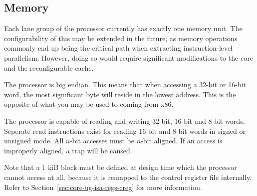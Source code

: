 
\subsection{Memory}
\label{sec:core-ug-isa-memory}

Each lane group of the \rvex{} processor currently has exactly one memory unit.
The configurability of this may be extended in the future, as memory operations
commonly end up being the critical path when extracting instruction-level
parallelism. However, doing so would require significant modifications to the
\rvex{} core and the reconfigurable cache.

The \rvex{} processor is big endian. This means that when accessing a 32-bit or 
16-bit word, the most significant byte will reside in the lowest address. This
is the opposite of what you may be used to coming from x86.

The \rvex{} processor is capable of reading and writing 32-bit, 16-bit and 8-bit
words. Seperate read instructions exist for reading 16-bit and 8-bit words in
signed or unsigned mode. All $n$-bit accesses must be $n$-bit aligned. If an
access is improperly aligned, a  trap will be caused.

Note that a 1 kiB block must be defined at design time which the \rvex{}
processor cannot access at all, because it is remapped to the control register
file internally. Refer to Section~\ref{sec:core-ug-isa-regs-creg} for more
information.

